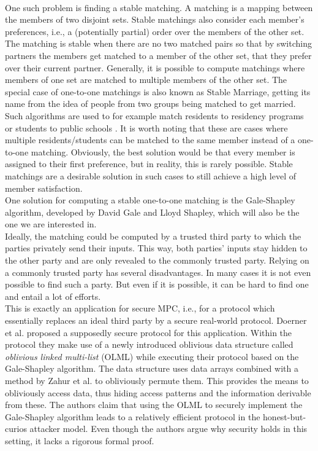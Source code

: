 \ \\One such problem is finding a stable matching. A matching is a mapping between the members of two disjoint sets. Stable matchings also consider each member's preferences, i.e., a (potentially partial) order over the members of the other set. The matching is stable when there are no two matched pairs so that by switching partners the members get matched to a member of the other set, that they prefer over their current partner. Generally, it is possible to compute matchings where members of one set are matched to multiple members of the other set. The special case of one-to-one matchings is also known as \glqq Stable Marriage\grqq, getting its name from the idea of people from two groups being matched to get married.\\ 
Such algorithms are used to for example match residents to residency programs \citep{nrmp} or students to public schools \citep{sm}. It is worth noting that these are cases where multiple  residents/students can be matched to the same member instead of a one-to-one matching. Obviously, the best solution would be that every member is assigned to their first preference, but in reality, this is rarely possible. Stable matchings are a desirable solution in such cases to still achieve a high level of member satisfaction.\\
One solution for computing a stable one-to-one matching is the Gale-Shapley algorithm, developed by David Gale and Lloyd Shapley, which will also be the one we are interested in.\\ 
Ideally, the matching could be computed by a trusted third party to which the parties privately send their inputs. This way, both parties' inputs stay hidden to the other party and are only revealed to the commonly trusted party.
Relying on a commonly trusted party has several disadvantages. In many cases it is not even possible to find such a party. But even if it is possible, it can be hard to find one and entail a lot of efforts. \\
This is exactly an application for secure MPC, i.e., for a protocol which essentially replaces an ideal third party by a secure real-world protocol. Doerner et al. \citep{smas} proposed a supposedly secure protocol for this application. Within the protocol they make use of a newly introduced oblivious data structure called \emph{\glqq oblivious linked multi-list\grqq} (OLML) while executing their protocol based on the Gale-Shapley algorithm. The data structure uses data arrays combined with a method by Zahur et al. \citep{rsqo} to obliviously permute them. This provides the means to obliviously access data, thus hiding access patterns and the information derivable from these. The authors claim that using the OLML to securely implement the Gale-Shapley algorithm leads to a relatively efficient protocol in the honest-but-curios attacker model. Even though the authors argue why security holds in this setting, it lacks a rigorous formal proof.\\
